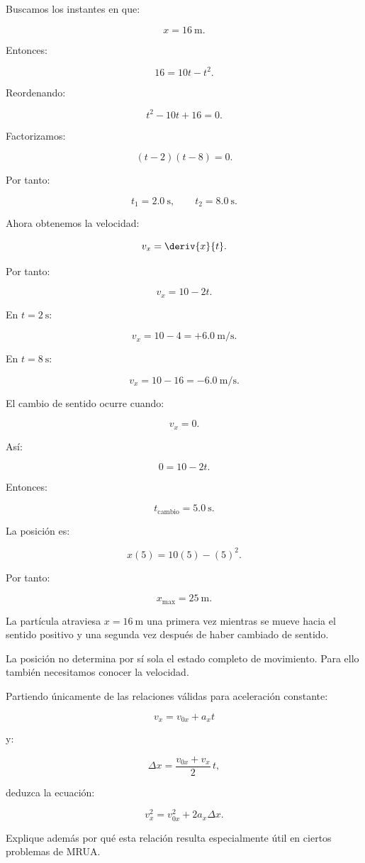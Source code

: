 \begin{explicacion}
Buscamos los instantes en que:

\[ x=\SI{16}{\meter}. \]

Entonces:

\[
16=10t-t^2.
\]

Reordenando:

\[
t^2-10t+16=0.
\]

Factorizamos:

\[
(t-2)(t-8)=0.
\]

Por tanto:

\[
\boxed{t_1=\SI{2.0}{\second}},
\qquad
\boxed{t_2=\SI{8.0}{\second}}.
\]

Ahora obtenemos la velocidad:

\[
v_x=\deriv{x}{t}.
\]

Por tanto:

\[
v_x=10-2t.
\]

En \(t=\SI{2}{\second}\):

\[
v_x=10-4
=
\boxed{+\SI{6.0}{\meter\per\second}}.
\]

En \(t=\SI{8}{\second}\):

\[
v_x=10-16
=
\boxed{-\SI{6.0}{\meter\per\second}}.
\]

El cambio de sentido ocurre cuando:

\[ v_x=0. \]

Así:

\[
0=10-2t.
\]

Entonces:

\[ \boxed{t_{\mathrm{cambio}}=\SI{5.0}{\second}}. \]

La posición es:

\[
x(5)
=
10(5)-(5)^2.
\]

Por tanto:

\[ \boxed{x_{\max}=\SI{25}{\meter}}. \]

La partícula atraviesa \(x=\SI{16}{\meter}\) una primera vez mientras se mueve hacia el sentido positivo y una segunda vez después de haber cambiado de sentido.

La posición no determina por sí sola el estado completo de movimiento. Para ello también necesitamos conocer la velocidad.
\end{explicacion}


\begin{ejercicio}
Partiendo únicamente de las relaciones válidas para aceleración constante:

\[
v_x=v_{0x}+a_xt
\]

y:

\[
\Delta x=\frac{v_{0x}+v_x}{2}\,t,
\]

deduzca la ecuación:

\[ v_x^2=v_{0x}^2+2a_x\Delta x. \]

Explique además por qué esta relación resulta especialmente útil en ciertos problemas de MRUA.
\end{ejercicio}

